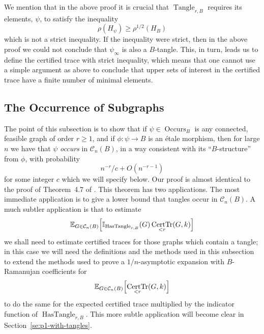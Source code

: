 \documentclass{memo-l}
\theoremstyle{plain}
\theoremstyle{definition}
\numberwithin{section}{chapter}
\numberwithin{equation}{chapter}
\newcommand{\rhoroot}[1]{\rho^{1/2}(H_{#1})}
\DeclareMathOperator{\HasTangle}{HasTangle}
\newcommand{\tanglefreeindicator}{\II_{\mathrm{TF}(r,B)}} %
\DeclareMathOperator{\Tr}{Tr}
\DeclareMathOperator{\CertTr}{CertTr}
\DeclareMathOperator{\Tangle}{Tangle}
\DeclareMathOperator{\Occurs}{Occurs}
\newcommand{\from}{\colon}
\theoremstyle{plain}
\theoremstyle{definition}
\newtheorem{defn}[theorem]{Definition}
\newcommand\EE{\mathbb{E}}
\newcommand\II{\mathbb{I}}
\newcommand\cC{\mathcal{C}}
\begin{document}
We mention that in the above proof it is crucial that $\Tangle_{r,B}$
requires its elements, $\psi$, to satisfy the inequality
$$
\rho(H_\psi) \ge \rhoroot B     %
$$
which is not a strict inequality.  If the inequality were strict, then
in the above proof we could not conclude that $\psi_\infty$ is also a
$B$-tangle.  This, in turn, leads us to define the certified trace
with strict inequality, which means that one cannot use a simple argument
as above to conclude that upper sets of interest in the certified trace
have a finite number of minimal elements.



\subsection{The Occurrence of Subgraphs}
\label{sb:occur}

The point of this subsection is to show that if $\psi\in\Occurs_B$
is any connected, feasible
graph of order 
$r\ge 1$, and if $\phi\from\psi\to B$ is an \'etale morphism,
then for large $n$ we have
that $\psi$ {\em occurs} in $\cC_n(B)$, in a way consistent
with its ``$B$-structure'' from $\phi$, with probability
\begin{equation}\label{eq:psi_probability}
n^{-r}/c + O(n^{-r-1}) 
\end{equation}
for some integer $c$ which we will specify below.
Our proof is almost identical to the proof of
Theorem~4.7 of \cite{friedman_alon}.  
This theorem has two applications.  The most immediate application
is to give a lower bound that tangles occur in $\cC_n(B)$.
A much subtler application is that to estimate
$$
\EE_{G\in\cC_n(B)} \Bigl[ \II_{\HasTangle_{r,B}}(G) \CertTr_{<r}(G,k) \Bigr]
$$
we shall need to estimate certified traces for those graphs which
contain a 
tangle; in this case we will need the definitions and the methods
used in this subsection to extend the methods used to prove 
a $1/n$-asymptotic expansion with $B$-Ramanujan coefficients for
$$
\EE_{G\in\cC_n(B)} \Bigl[ \CertTr_{<r}(G,k) \Bigr]
$$
to do the same for the expected certified trace multiplied by
the indicator function of 
$\HasTangle_{r,B}$.  This more subtle application will become
clear in Section~\ref{se:p1-with-tangles}.
\end{document}
